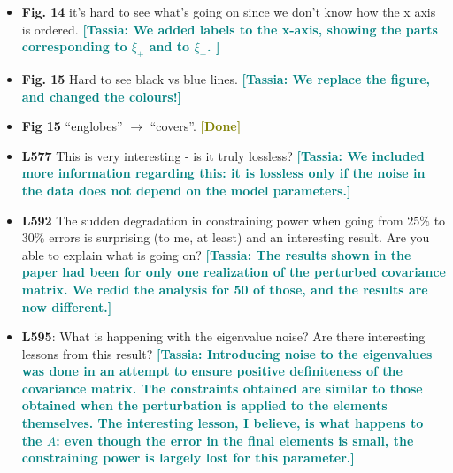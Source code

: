 \documentclass{article}
\newcommand\tassia[1]{{\bf {\textcolor{teal}{[Tassia: #1]}}}}
\newcommand\done{{\bf {\textcolor{olive}{[Done]}}}}
\begin{document}
\begin{itemize}
	\item \textbf{Fig. 14} it’s hard to see what’s going on since we don’t know how the x axis is ordered. \tassia{We added labels to the x-axis, showing the parts corresponding to $\xi_+$ and to $\xi_-$. }
	\item \textbf{Fig. 15} Hard to see black vs blue lines. \tassia{We replace the figure, and changed the colours!}
	\item \textbf{Fig 15} “englobes” $\rightarrow$ “covers”. \done
	\item \textbf{L577} This is very interesting - is it truly lossless? \tassia{We included more information regarding this: it is lossless only if the noise in the data does not depend on the model parameters.}
	\item \textbf{L592} The sudden degradation in constraining power when going from $25\%$ to $30\%$ errors is surprising (to me, at least) and an interesting result. Are you able to explain what is going on? \tassia{The results shown in the paper had been for only one realization of the perturbed covariance matrix. We redid the analysis for 50 of those, and the results are now different.}
	\item \textbf{L595}: What is happening with the eigenvalue noise? Are there interesting lessons from this result? \tassia{Introducing noise to the eigenvalues was done in an attempt to ensure positive definiteness of the covariance matrix. The constraints obtained are similar to those obtained when the perturbation is applied to the elements themselves. The interesting lesson, I believe, is what happens to the $A$: even though the error in the final elements is small, the constraining power is largely lost for this parameter.}
\end{itemize}
\end{document}
